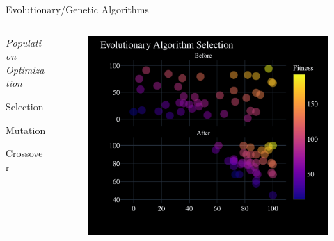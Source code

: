 \documentclass[aspectratio=169]{beamer}
\newcommand{\cb}[1]{{\color{c2} #1}}
\begin{document}
\begin{frame}{Evolutionary/Genetic Algorithms}
  \begin{columns}[T]
      \begin{column}{.4\linewidth}
      \Huge \textit{\cb{Population Optimization}}
      \begin{vfilleditems}
          \item \Huge Selection
          \item \Huge Mutation
          \item \Huge Crossover
      \end{vfilleditems}
      \end{column}
      \begin{column}{.6\linewidth}
          \begin{figure}
              \centering
              \includegraphics[width=0.95\linewidth, keepaspectratio]{figures/genetic_diagram.pdf}
          \end{figure}
      \end{column}
  \end{columns}
\end{frame}
\end{document}
